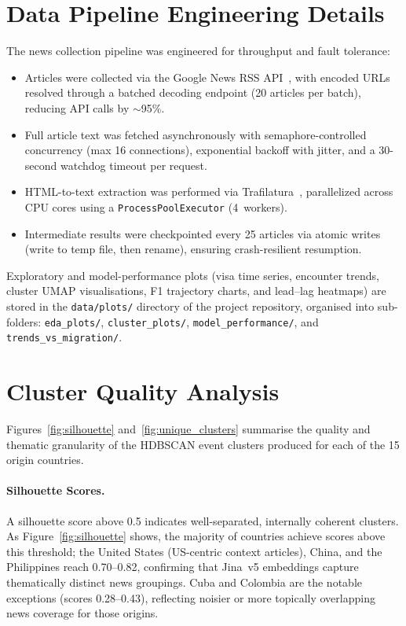 \documentclass[11pt, a4paper]{article}
\begin{document}
\begin{appendices}
\section{Data Pipeline Engineering Details}\label{app:pipeline}

The news collection pipeline was engineered for throughput and fault tolerance:

\begin{itemize}
  \item Articles were collected via the Google News RSS API~\citep{google_news}, with
        encoded URLs resolved through a batched decoding endpoint (20 articles per
        batch), reducing API calls by ${\sim}$95\%.
  \item Full article text was fetched asynchronously with semaphore-controlled
        concurrency (max 16 connections), exponential backoff with jitter, and a
        30-second watchdog timeout per request.
  \item HTML-to-text extraction was performed via
        Trafilatura~\citep{trafilatura}, parallelized across CPU cores using a
        \texttt{ProcessPoolExecutor} (4~workers).
  \item Intermediate results were checkpointed every 25 articles via atomic writes
        (write to temp file, then rename), ensuring crash-resilient resumption.
\end{itemize}

Exploratory and model-performance plots (visa time series, encounter trends,
cluster UMAP visualisations, F1 trajectory charts, and lead--lag heatmaps) are
stored in the \texttt{data/plots/} directory of the project repository, organised
into sub-folders: \texttt{eda\_plots/}, \texttt{cluster\_plots/},
\texttt{model\_performance/}, and \texttt{trends\_vs\_migration/}.


\section{Cluster Quality Analysis}\label{app:clusterquality}

Figures~\ref{fig:silhouette} and~\ref{fig:unique_clusters} summarise the quality
and thematic granularity of the HDBSCAN event clusters produced for each of the
15 origin countries.

\paragraph{Silhouette Scores.}
A silhouette score above 0.5 indicates well-separated, internally coherent
clusters.  As Figure~\ref{fig:silhouette} shows, the majority of countries achieve
scores above this threshold; the United States (US-centric context articles),
China, and the Philippines reach 0.70--0.82, confirming that Jina~v5 embeddings
capture thematically distinct news groupings.  Cuba and Colombia are the notable
exceptions (scores 0.28--0.43), reflecting noisier or more topically overlapping
news coverage for those origins.


\end{appendices}
\end{document}

